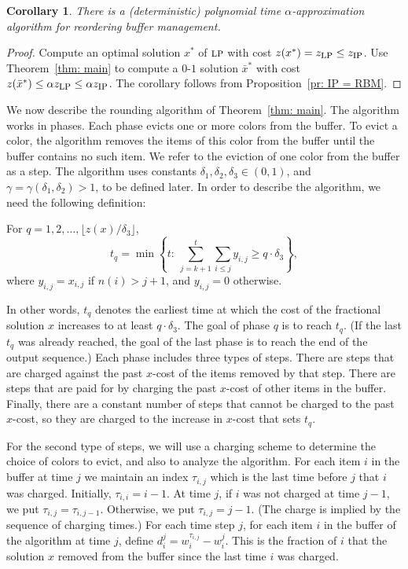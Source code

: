 \documentclass[11pt]{article}
\newtheorem{corollary}[theorem]{Corollary}
\newcommand{\LP}{{\hbox{\sc lp}}}
\newcommand{\IP}{{\hbox{\sc ip}}}
\begin{document}
\begin{corollary}\label{cor: main}
There is a (deterministic) polynomial time $\alpha$-approximation
algorithm for reordering buffer management.
\end{corollary}

\begin{proof}
Compute an optimal solution $x^*$ of $\LP$ with cost
$z(x^*) = z_{\LP}\le z_{\IP}$. Use Theorem~\ref{thm: main}
to compute a $0$-$1$ solution $\bar{x}^*$ with cost
$z(\bar{x}^*)\le\alpha z_{\LP}\le \alpha z_{\IP}$.
The corollary follows from Proposition~\ref{pr: IP = RBM}.
\end{proof}


We now describe the rounding algorithm of Theorem~\ref{thm: main}.
The algorithm works in phases. Each phase evicts one or more colors
from the buffer. To evict a color, the algorithm removes the items of
this color from the buffer until the buffer contains no such item. We
refer to the eviction of one color from the buffer as a step. The algorithm
uses constants $\delta_1,\delta_2,\delta_3\in (0,1)$, and
$\gamma=\gamma(\delta_1,\delta_2) > 1$, to be defined
later. In order to describe the algorithm, we need the following definition:
\begin{definition}
For $q=1,2,\dots,\lfloor z(x) / \delta_3 \rfloor$,
$$
t_q = \min\left\{t:\ \sum_{j=k+1}^t \sum_{i\le j} y_{i,j} \ge
    q\cdot\delta_3\right\},
$$
where $y_{i,j} = x_{i,j}$ if $n(i) > j + 1$, and $y_{i,j}=0$ otherwise. 
\end{definition}
In other words, $t_q$ denotes the earliest time at which the cost of
the fractional solution $x$ increases to at least $q\cdot\delta_3$.
The goal of phase $q$ is to reach $t_q$. (If the last $t_q$ was
already reached, the goal of the last phase is to reach the end
of the output sequence.) Each phase includes
three types of steps. There are steps that are charged against the
past $x$-cost of the items removed by that step. There are steps
that are paid for by charging the past $x$-cost of other items in
the buffer. Finally, there are a constant number of steps that cannot
be charged to the past $x$-cost, so they are charged to the increase
in $x$-cost that sets $t_q$.

For the second type of steps, we will use a charging scheme to determine
the choice of colors to evict, and also to analyze the algorithm. For each item
$i$ in the buffer at time $j$ we
maintain an index $\tau_{i,j}$ which is the last time before $j$ that $i$ was
charged. Initially, $\tau_{i,i} = i-1$. At time $j$, if $i$ was not charged at
time $j-1$, we put $\tau_{i,j} = \tau_{i,j-1}$. Otherwise, we put $\tau_{i,j} = j-1$.
(The charge is implied by the sequence of charging times.)
For each time step $j$, for each item $i$ in the buffer of the algorithm at time
$j$, define $d^j_i = w_i^{\tau_{i,j}} - w_i^j$. This is the fraction of $i$ that the
solution $x$ removed from the buffer since the last time $i$ was charged.
\end{document}
